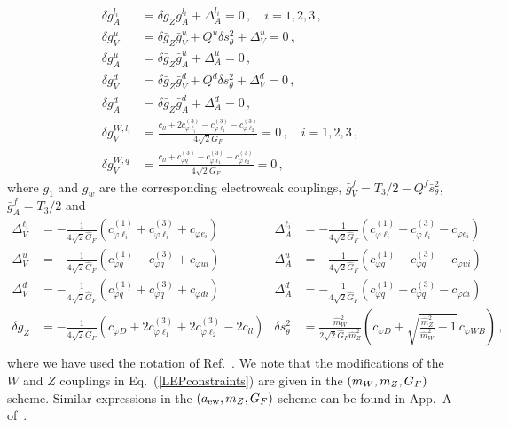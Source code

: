 {\begin{align}
\delta g_{A}^{l_i}&=\delta \bar{g}_{Z} \bar{g}_{A}^{l_i}+\Delta_{A}^{l_i} = 0\, , \quad i=1,2,3\, , \\\nonumber
\delta g_{V}^{u}&=\delta \bar{g}_{Z} \bar{g}_{V}^{u}+Q^{u} \delta s_{\theta}^{2}+\Delta_{V}^{u} = 0\, , \\\nonumber
\delta g_{A}^{u}&=\delta \bar{g}_{Z} \bar{g}_{A}^{u}+\Delta_{A}^{u} = 0\, ,\label{LEPconstraints} \\
\delta g_{V}^{d}&=\delta \bar{g}_{Z} \bar{g}_{V}^{d}+Q^{d} \delta s_{\theta}^{2}+\Delta_{V}^{d} = 0\, , \\\nonumber
\delta g_{A}^{d}&=\delta \bar{g}_{Z} \bar{g}_{A}^{d}+\Delta_{A}^{d} = 0\, , \\\nonumber
\delta g_V^{W, l_i}&= \frac{c_{ll} + 2 c_{\varphi \ell_i}^{(3)} - c_{\varphi \ell_1}^{(3)} - c_{\varphi \ell_2}^{(3)}}{4 \sqrt{2} G_F} = 0 \, , \quad i=1,2,3\, , \\\nonumber
\delta g_V^{W, q}&= \frac{ c_{ll} + c_{\varphi q}^{(3)} - c_{\varphi \ell_1}^{(3)} - c_{\varphi \ell_2}^{(3)}}{4 \sqrt{2} G_F} = 0 \, ,
\end{align}
where $g_1$ and $g_w$ are the corresponding electroweak couplings, $\bar{g}_{V}^{f}=T_{3} / 2-Q^{f} \bar{s}_{\theta}^{2}$, $\bar{g}_{A}^{f}=T_{3} / 2$ and
\begin{align*}
\Delta_{V}^{\ell_i} &=-\frac{1}{4 \sqrt{2} \hat{G}_{F}}\left(c_{\varphi \ell_i}^{(1)}+c_{\varphi \ell_i}^{(3)}+c_{\varphi e_i}\right) & \Delta_{A}^{\ell_i}&=-\frac{1}{4 \sqrt{2} \hat{G}_{F}}\left(c_{\varphi \ell_i}^{(1)}+c_{\varphi \ell_i}^{(3)}-c_{\varphi e_i}\right) \\
\Delta_{V}^{u} &=-\frac{1}{4 \sqrt{2} \hat{G}_{F}}\left(c_{\varphi q}^{(1)}-c_{\varphi q}^{(3)}+c_{\varphi u i}\right) & \Delta_{A}^{u} &=-\frac{1}{4 \sqrt{2} \hat{G}_{F}}\left(c_{\varphi q}^{(1)}-c_{\varphi q}^{(3)}-c_{\varphi u i}\right) \\
\Delta_{V}^{d} &=-\frac{1}{4 \sqrt{2} \hat{G}_{F}}\left(c_{\varphi q}^{(1)}+c_{\varphi q}^{(3)}+c_{\varphi d i}\right) & \Delta_{A}^{d} &=-\frac{1}{4 \sqrt{2} \hat{G}_{F}}\left(c_{\varphi q}^{(1)}+c_{\varphi q}^{(3)}-c_{\varphi d i}\right) \\
\delta g_Z &=-\frac{1}{4 \sqrt{2} \hat{G}_{F}}\left(c_{\varphi D}+2 c_{\varphi \ell_1}^{(3)} + 2 c_{\varphi \ell_2}^{(3)}-2 c_{l l}\right) & \delta s_{\theta}^{2}&= \frac{\hat{m}_{W}^{2}}{2 \sqrt{2} \hat{G}_{F} \hat{m}_{Z}^{2}}\left(c_{\varphi D} + \sqrt{\frac{\hat{m}_{Z}^{2}}{\hat{m}_{W}^{2}} - 1} \, c_{\varphi W B}  \right) \, ,\\ 
\end{align*}
where we have used the notation of Ref.~\cite{Brivio:2017bnu}. We note that the modifications of the
$W$ and $Z$ couplings in Eq.~(\ref{LEPconstraints}) are given in the $\lp m_W,m_Z, G_F\rp$ scheme.
%
Similar 
expressions in the $\lp a_{\rm ew},m_Z, G_F\rp$ scheme can be found in 
 App.~A of~\cite{Falkowski:2001958}.
%
}
